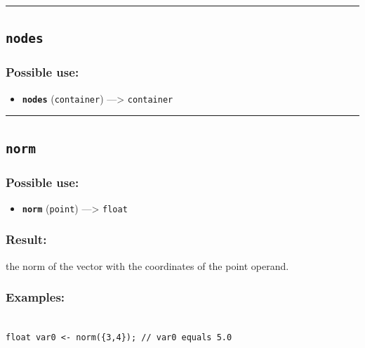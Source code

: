 \documentclass[]{book}
\providecommand{\tightlist}{%
  \setlength{\itemsep}{0pt}\setlength{\parskip}{0pt}}
\theoremstyle{definition}
\theoremstyle{definition}
\theoremstyle{definition}
\theoremstyle{remark}
\begin{document}
\begin{center}\rule{0.5\linewidth}{\linethickness}\end{center}

\subsection{\texorpdfstring{\texttt{nodes}}{nodes}}\label{nodes}

\subsubsection{Possible use:}\label{possible-use-374}

\begin{itemize}
\tightlist
\item
  \textbf{\texttt{nodes}} (\texttt{container}) ---\textgreater{}
  \texttt{container}
\end{itemize}

\begin{center}\rule{0.5\linewidth}{\linethickness}\end{center}

\subsection{\texorpdfstring{\texttt{norm}}{norm}}\label{norm}

\subsubsection{Possible use:}\label{possible-use-375}

\begin{itemize}
\tightlist
\item
  \textbf{\texttt{norm}} (\texttt{point}) ---\textgreater{}
  \texttt{float}
\end{itemize}

\subsubsection{Result:}\label{result-361}

the norm of the vector with the coordinates of the point operand.

\subsubsection{Examples:}\label{examples-260}

\begin{verbatim}
 
float var0 <- norm({3,4}); // var0 equals 5.0
\end{verbatim}
\end{document}

